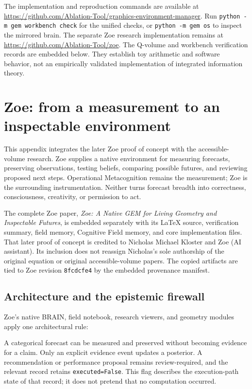 \documentclass[11pt,a4paper]{article}
\begin{document}
The implementation and reproduction commands are available at \url{https://github.com/Ablation-Tool/graphics-environment-manager}. Run \texttt{python -m gem workbench check} for the unified checks, or \texttt{python -m gem os} to inspect the mirrored brain. The separate Zoe research implementation remains at \url{https://github.com/Ablation-Tool/zoe}. The Q-volume and workbench verification records are embedded below. They establish toy arithmetic and software behavior, not an empirically validated implementation of integrated information theory.

\section{Zoe: from a measurement to an inspectable environment}
This appendix integrates the later Zoe proof of concept with the accessible-volume research. Zoe supplies a native environment for measuring forecasts, preserving observations, testing beliefs, comparing possible futures, and reviewing proposed next steps. Operational Metacognition remains the measurement; Zoe is the surrounding instrumentation. Neither turns forecast breadth into correctness, consciousness, creativity, or permission to act.

The complete Zoe paper, \emph{Zoe: A Native GEM for Living Geometry and Inspectable Futures}, is embedded separately with its LaTeX source, verification summary, field memory, Cognitive Field memory, and core implementation files. That later proof of concept is credited to Nicholas Michael Kloster and Zoe (AI assistant). Its inclusion does not reassign Nicholas's sole authorship of the original equation or original accessible-volume papers. The copied artifacts are tied to Zoe revision \texttt{8fcdcfe4} by the embedded provenance manifest.

\subsection{Architecture and the epistemic firewall}
Zoe's native BRAIN, field notebook, research viewers, and geometry modules apply one architectural rule:
\begin{center}
\end{center}
A categorical forecast can be measured and preserved without becoming evidence for a claim. Only an explicit evidence event updates a posterior. A recommendation or performance proposal remains review-required, and the relevant record retains \texttt{executed=False}. This flag describes the execution-path state of that record; it does not pretend that no computation occurred.
\end{document}
